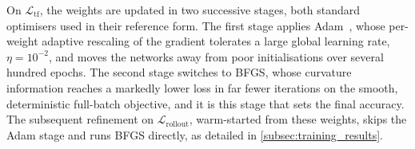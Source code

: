 On $\mathcal{L}_\mathrm{tf}$, the weights are updated in two successive stages, both standard
optimisers used in their reference form. The first stage applies Adam~\cite{kingma2015adam},
whose per-weight adaptive rescaling of the gradient tolerates a large global learning rate,
$\eta = 10^{-2}$, and moves the networks away from poor initialisations over several
hundred epochs. The second stage switches to BFGS,
whose curvature information reaches a markedly lower loss in far fewer iterations on the
smooth, deterministic full-batch objective, and it is this stage that sets the final
accuracy. The subsequent refinement on $\mathcal{L}_\mathrm{rollout}$, warm-started from
these weights, skips the Adam stage and runs BFGS directly, as detailed in
\cref{subsec:training_results}.
